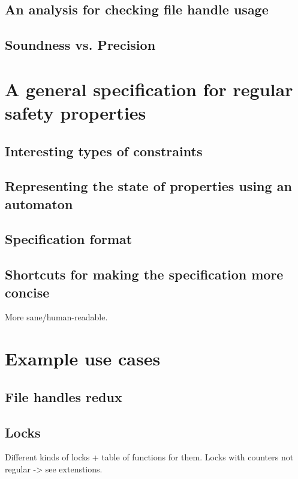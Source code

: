 \section{An analysis for checking file handle usage}

\section{Soundness vs. Precision}


\chapter{A general specification for regular safety properties}
\section{Interesting types of constraints}

\section{Representing the state of properties using an automaton}

\section{Specification format}

\section{Shortcuts for making the specification more concise}
More sane/human-readable.


\chapter{Example use cases}

\section{File handles redux}

\section{Locks}
Different kinds of locks + table of functions for them.
Locks with counters not regular -> see extenstions.

